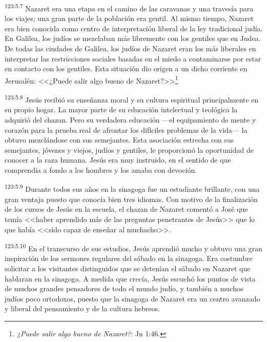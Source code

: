 \par 
\textsuperscript{123:5.7} Nazaret era una etapa en el camino de las caravanas y una travesía para los viajes; una gran parte de la población era gentil. Al mismo tiempo, Nazaret era bien conocida como centro de interpretación liberal de la ley tradicional judía. En Galilea, los judíos se mezclaban más libremente con los gentiles que en Judea. De todas las ciudades de Galilea, los judíos de Nazaret eran los más liberales en interpretar las restricciones sociales basadas en el miedo a contaminarse por estar en contacto con los gentiles. Esta situación dio origen a un dicho corriente en Jerusalén: <<¿Puede salir algo bueno de Nazaret?>>\footnote{\textit{¿Puede salir algo bueno de Nazaret?}: Jn 1:46.}

\par 
\textsuperscript{123:5.8} Jesús recibió su enseñanza moral y su cultura espiritual principalmente en su propio hogar. La mayor parte de su educación intelectual y teológica la adquirió del chazan. Pero su verdadera educación ---el equipamiento de mente y corazón para la prueba real de afrontar los difíciles problemas de la vida--- la obtuvo mezclándose con sus semejantes. Esta asociación estrecha con sus semejantes, jóvenes y viejos, judíos y gentiles, le proporcionó la oportunidad de conocer a la raza humana. Jesús era muy instruido, en el sentido de que comprendía a fondo a los hombres y los amaba con devoción.

\par 
\textsuperscript{123:5.9} Durante todos sus años en la sinagoga fue un estudiante brillante, con una gran ventaja puesto que conocía bien tres idiomas. Con motivo de la finalización de los cursos de Jesús en la escuela, el chazan de Nazaret comentó a José que temía <<haber aprendido más de las preguntas penetrantes de Jesús>> que lo que había <<sido capaz de enseñar al muchacho>>.

\par 
\textsuperscript{123:5.10} En el transcurso de sus estudios, Jesús aprendió mucho y obtuvo una gran inspiración de los sermones regulares del sábado en la sinagoga. Era costumbre solicitar a los visitantes distinguidos que se detenían el sábado en Nazaret que hablaran en la sinagoga. A medida que crecía, Jesús escuchó los puntos de vista de muchos grandes pensadores de todo el mundo judío, y también a muchos judíos poco ortodoxos, puesto que la sinagoga de Nazaret era un centro avanzado y liberal del pensamiento y de la cultura hebreos.

